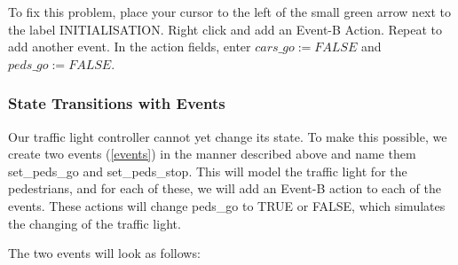 To fix this problem, place your cursor to the left of the small green arrow next to the label \textsf{INITIALISATION}. Right click and add an \textsf{Event-B Action}. Repeat to add another event. In the action fields, enter $cars\_go :=  FALSE$ and $peds\_go :=  FALSE$.



\subsubsection{State Transitions with Events}

Our traffic light controller cannot yet change its state.  To make this possible, we create two events (\ref{events}) in the manner described above and name them \textsf{set\_peds\_go} and \textsf{set\_peds\_stop}. This will model the traffic light for the pedestrians, and for each of these, we will add an Event-B action to each of the events. These actions will change \textsf{peds\_go} to \textsf{TRUE} or \textsf{FALSE}, which simulates the changing of the traffic light.


The two events will look as follows:


